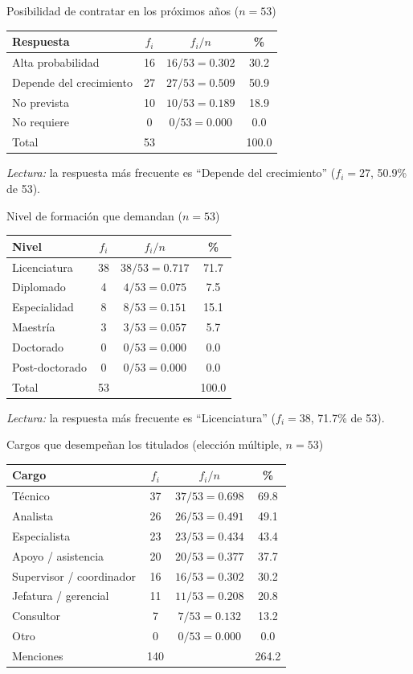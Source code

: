 \begin{mitabla}{Posibilidad de contratar en los próximos años ($n=53$)}
\begin{tabular}{lccc}
\toprule
Respuesta & $f_i$ & $f_i / n$ & \% \\
\midrule
Alta probabilidad & 16 & $16/53 = 0.302$ & 30.2 \\
Depende del crecimiento & 27 & $27/53 = 0.509$ & 50.9 \\
No prevista & 10 & $10/53 = 0.189$ & 18.9 \\
No requiere & 0 & $0/53 = 0.000$ & 0.0 \\
\midrule
Total & 53 & & 100.0 \\
\bottomrule
\end{tabular}
\end{mitabla}

\textit{Lectura:} la respuesta más frecuente es ``Depende del crecimiento'' ($f_i = 27$, 50.9\% de 53).

\begin{mitabla}{Nivel de formación que demandan ($n=53$)}
\begin{tabular}{lccc}
\toprule
Nivel & $f_i$ & $f_i / n$ & \% \\
\midrule
Licenciatura & 38 & $38/53 = 0.717$ & 71.7 \\
Diplomado & 4 & $4/53 = 0.075$ & 7.5 \\
Especialidad & 8 & $8/53 = 0.151$ & 15.1 \\
Maestría & 3 & $3/53 = 0.057$ & 5.7 \\
Doctorado & 0 & $0/53 = 0.000$ & 0.0 \\
Post-doctorado & 0 & $0/53 = 0.000$ & 0.0 \\
\midrule
Total & 53 & & 100.0 \\
\bottomrule
\end{tabular}
\end{mitabla}

\textit{Lectura:} la respuesta más frecuente es ``Licenciatura'' ($f_i = 38$, 71.7\% de 53).

\begin{mitabla}{Cargos que desempeñan los titulados (elección múltiple, $n=53$)}
\begin{tabular}{lccc}
\toprule
Cargo & $f_i$ & $f_i / n$ & \% \\
\midrule
Técnico & 37 & $37/53 = 0.698$ & 69.8 \\
Analista & 26 & $26/53 = 0.491$ & 49.1 \\
Especialista & 23 & $23/53 = 0.434$ & 43.4 \\
Apoyo / asistencia & 20 & $20/53 = 0.377$ & 37.7 \\
Supervisor / coordinador & 16 & $16/53 = 0.302$ & 30.2 \\
Jefatura / gerencial & 11 & $11/53 = 0.208$ & 20.8 \\
Consultor & 7 & $7/53 = 0.132$ & 13.2 \\
Otro & 0 & $0/53 = 0.000$ & 0.0 \\
\midrule
Menciones & 140 & & 264.2 \\
\bottomrule
\end{tabular}
\end{mitabla}

